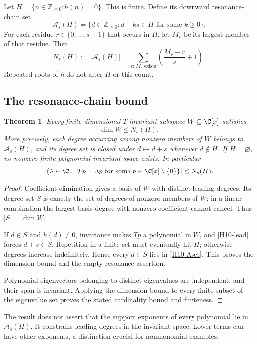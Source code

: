 \documentclass[11pt,a4paper]{article}
\newtheorem{theorem}{Theorem}[section]
\theoremstyle{definition}\newtheorem{definition}[theorem]{Definition}
\theoremstyle{remark}\newtheorem{remark}[theorem]{Remark}
\numberwithin{equation}{section}
\begin{document}
Let $H=\{n\in\mathbb Z_{\ge0}:h(n)=0\}$. This is finite. Define its downward resonance-chain set
\begin{equation}\label{H10-Aset}
\mathcal A_s(H)=\{d\in\mathbb Z_{\ge0}:d+ks\in H\text{ for some }k\ge0\}.
\end{equation}
For each residue $r\in\{0,\ldots,s-1\}$ that occurs in $H$, let $M_r$ be its largest member of that residue. Then
\begin{equation}\label{H10-count}
N_s(H):=|\mathcal A_s(H)|=
\sum_{r:\,M_r\text{ exists}}\left(\frac{M_r-r}{s}+1\right).
\end{equation}
Repeated roots of $h$ do not alter $H$ or this count.
\subsection{The resonance-chain bound}\label{H10-sec-2}
\begin{theorem}\label{H10-main}
Every finite-dimensional $T$-invariant subspace $W\subseteq\C[x]$ satisfies
\[\dim W\le N_s(H).
\]
More precisely, each degree occurring among nonzero members of $W$ belongs to $\mathcal A_s(H)$, and its degree set is closed under $d\mapsto d+s$ whenever $d\notin H$. If $H=\varnothing$, no nonzero finite polynomial invariant space exists. In particular
\[|\{\lambda\in\C:\ Tp=\lambda p\text{ for some }p\in\C[x]\setminus\{0\}\}|\le N_s(H).
\]
\end{theorem}
\begin{proof}
Coefficient elimination gives a basis of $W$ with distinct leading degrees. Its degree set $S$ is exactly the set of degrees of nonzero members of $W$: in a linear combination the largest basis degree with nonzero coefficient cannot cancel. Thus $|S|=\dim W$.

If $d\in S$ and $h(d)\ne0$, invariance makes $Tp$ a polynomial in $W$, and \eqref{H10-lead} forces $d+s\in S$. Repetition in a finite set must eventually hit $H$; otherwise degrees increase indefinitely. Hence every $d\in S$ lies in \eqref{H10-Aset}. This proves the dimension bound and the empty-resonance assertion.

Polynomial eigenvectors belonging to distinct eigenvalues are independent, and their span is invariant. Applying the dimension bound to every finite subset of the eigenvalue set proves the stated cardinality bound and finiteness.
\end{proof}
The result does not assert that the support exponents of every polynomial lie in $\mathcal A_s(H)$. It constrains leading degrees in the invariant space. Lower terms can have other exponents, a distinction crucial for nonmonomial examples.
\end{document}
